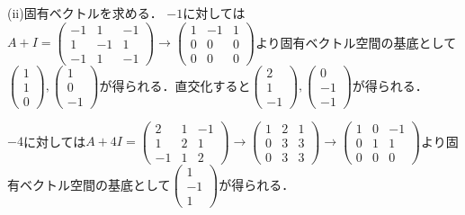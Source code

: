\documentclass[
		book,
		head_space=20mm,
		foot_space=20mm,
		gutter=10mm,
		line_length=190mm
]{jlreq}
\begin{document}
(ii)固有ベクトルを求める．
$-1$に対しては$A+I=\begin{pmatrix}
    -1 & 1 & -1 \\
    1 & -1 & 1 \\
    -1 & 1 & -1
    \end{pmatrix}\rightarrow\begin{pmatrix}
        1 & -1 & 1 \\
        0 & 0 & 0 \\
        0 & 0 & 0
    \end{pmatrix}$より固有ベクトル空間の基底として$\begin{pmatrix}
            1 \\
            1 \\
            0
   \end{pmatrix},\begin{pmatrix}
                1 \\
                0 \\
                -1
    \end{pmatrix}$が得られる．直交化すると$\begin{pmatrix}
        2 \\
        1 \\
        -1
        \end{pmatrix},\begin{pmatrix}
            0 \\
            -1 \\
            -1
            \end{pmatrix}$が得られる．
                    

$-4$に対しては$A+4I=\begin{pmatrix}
    2 & 1 & -1 \\
    1 & 2 & 1 \\
    -1 & 1 & 2
    \end{pmatrix}\rightarrow\begin{pmatrix}
        1 & 2 & 1 \\
        0 & 3 & 3 \\
        0 & 3 & 3
        \end{pmatrix}\rightarrow\begin{pmatrix}
            1 & 0 & -1 \\
            0 & 1 & 1 \\
            0 & 0 & 0
            \end{pmatrix}$より固有ベクトル空間の基底として$\begin{pmatrix}
                1 \\
                -1 \\
                1
                \end{pmatrix}$が得られる．
\end{document}
